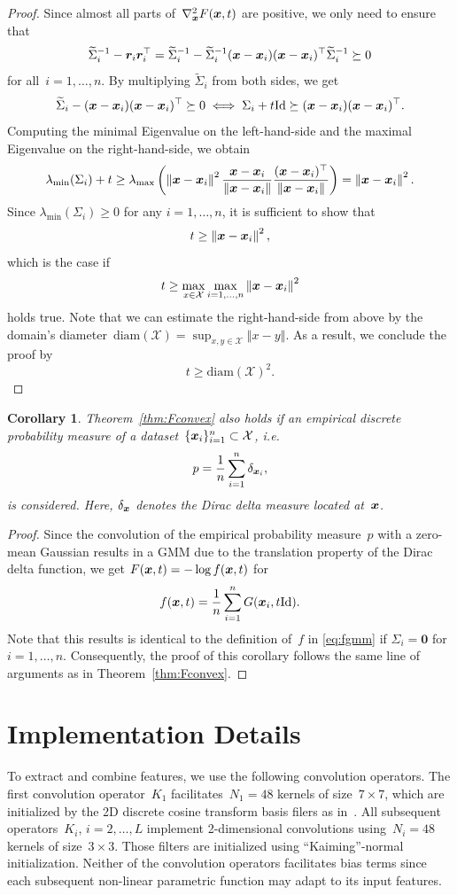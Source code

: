 \documentclass[nohyperref]{article}
\newcommand{\X}{\mathcal{X}}
\newcommand{\id}{\mathrm{Id}}
\newcommand{\norm}[1]{\left\Vert#1\right\Vert}
\newcommand{\diameter}{\mathrm{diam}}
\theoremstyle{plain}
\newtheorem{corollary}[theorem]{Corollary}
\theoremstyle{definition}
\theoremstyle{remark}
\begin{document}
\begin{proof}
Since almost all parts of~$\nabla_{\bm{x}}^2 F({\bm{x}}, t)$ are positive, we only need to ensure that
\[
\widetilde{\Sigma}_i^{-1} - {\bm{r}}_i{\bm{r}}_i^\top = \widetilde{\Sigma}_i^{-1} - \widetilde{\Sigma}_i^{-1} ({\bm{x}}-{\bm{x}}_i)({\bm{x}}-{\bm{x}}_i)^\top \widetilde{\Sigma}_i^{-1} \succeq 0
\]
for all~$i=1,\ldots,n$.
By multiplying $\widetilde{\Sigma}_i$ from both sides, we get
\[
\widetilde{\Sigma}_i - (\vx-\vx_i)(\vx-\vx_i)^\top \succeq 0 \iff \Sigma_i + t\id \succeq (\vx-\vx_i)(\vx-\vx_i)^\top.
\]
Computing the minimal Eigenvalue on the left-hand-side and the maximal Eigenvalue on the right-hand-side, we obtain
\[
\lambda_\mathrm{min}(\Sigma_i) + t \geq \lambda_\mathrm{max}\left(\norm{\vx-\vx_i}^2 \frac{\vx-\vx_i}{\norm{\vx-\vx_i}}\frac{(\vx-\vx_i)^\top}{\norm{\vx-\vx_i}}\right) = \norm{\vx-\vx_i}^2.
\]
Since $\lambda_\mathrm{min}(\Sigma_i)\geq0$ for any $i=1,\ldots,n$, it is sufficient to show that
\[
t\geq \norm{\vx-\vx_i}^2,
\]
which is the case if 
\[
t\geq \max_{x\in\X}\max_{i=1,\ldots,n} \norm{\vx-\vx_i}^2
\]
holds true.
Note that we can estimate the right-hand-side from above by the domain's diameter~$\diameter(\X)=\sup_{x,y\in\X}\norm{x-y}$.
As a result, we conclude the proof by
\[
t\geq \diameter(\X)^2.
\]
\end{proof}

\begin{corollary}
Theorem~\ref{thm:Fconvex} also holds if an empirical discrete probability measure of a dataset~$\{\vx_i\}_{i=1}^n\subset\X$, i.e.
\[
p = \frac{1}{n}\sum_{i=1}^n\delta_{{\bm{x}}_i},
\]
is considered.
Here, $\delta_{{\bm{x}}}$ denotes the Dirac delta measure located at~${\bm{x}}$.
\end{corollary}

\begin{proof}
Since the convolution of the empirical probability measure~$p$ with a zero-mean Gaussian results in a GMM due to the translation property of the Dirac delta function, we get $F({\bm{x}},t) = -\log f({\bm{x}},t)$ for
\[
f(\vx,t)=\frac{1}{n}\sum_{i=1}^n G(\vx_i, t\id).
\]
Note that this results is identical to the definition of~$f$ in \eqref{eq:fgmm} if $\Sigma_i=\bm{0}$ for $i=1,\ldots,n$.
Consequently, the proof of this corollary follows the same line of arguments as in Theorem~\ref{thm:Fconvex}.
\end{proof}

\section{Implementation Details} \label{apdx:implementationDetails}
To extract and combine features, we use the following convolution operators.
The first convolution operator~$K_1$ facilitates~$N_1=48$ kernels of size~$7\times 7$, which are initialized by the 2D discrete cosine transform basis filers as in~\citet{ChPo16,KoKl17}.
All subsequent operators~$K_i$, $i=2,\ldots,L$ implement 2-dimensional convolutions using~$N_i=48$ kernels of size~$3\times 3$.
Those filters are initialized using ``Kaiming''-normal initialization.
Neither of the convolution operators facilitates bias terms since each subsequent non-linear parametric function may adapt to its input features.
\end{document}

